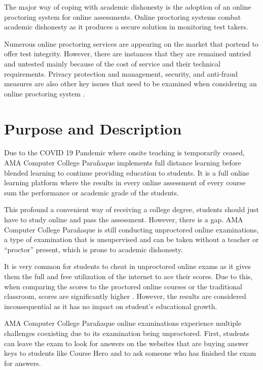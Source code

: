 The major way of coping with academic dishonesty is the adoption of an online proctoring system for online assessments.
Online proctoring systems combat academic dishonesty as it produces a secure solution in monitoring test takers.

Numerous online proctoring services are appearing on the market that portend to offer test integrity.
However, there are instances that they are remained untried and untested mainly because of the cost of service and their technical requirements.
Privacy protection and management, security, and anti-fraud measures are also other key issues that need to be examined when considering an online proctoring system \cite{sietses2016white}.

\section{Purpose and Description}

Due to the COVID 19 Pandemic where onsite teaching is temporarily ceased, AMA Computer College Parañaque implements full distance learning before blended learning to continue providing education to students.
It is a full online learning platform where the results in every online assessment of every course sum the performance or academic grade of the students.

This profound a convenient way of receiving a college degree, students should just have to study online and pass the assessment.
However, there is a gap.
AMA Computer College Parañaque is still conducting unproctored online examinations, a type of examination that is unsupervised and can be taken without a teacher or “proctor” present, which is prone to academic dishonesty.

It is very common for students to cheat in unproctored online exams as it gives them the full and free utilization of the internet to ace their scores.
Due to this, when comparing the scores to the proctored online courses or the traditional classroom, scores are significantly higher \cite{weiner2017comparative}.
However, the results are considered inconsequential as it has no impact on student’s educational growth.

AMA Computer College Parañaque online examinations experience multiple challenges coexisting due to its examination being unproctored.
First, students can leave the exam to look for answers on the websites that are buying answer keys to students like Course Hero and to ask someone who has finished the exam for answers.


